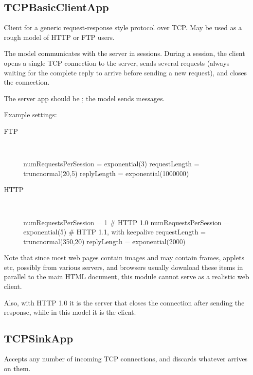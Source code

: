 \subsection{TCPBasicClientApp}

Client for a generic request-response style protocol over TCP.
May be used as a rough model of HTTP or FTP users.

The model communicates with the server in sessions. During a session,
the client opens a single TCP connection to the server, sends several
requests (always waiting for the complete reply to arrive before
sending a new request), and closes the connection.

The server app should be ; the model sends
 messages.

Example settings:

\begin{description}
\item[FTP] \quad \\

\begin{inifile}
numRequestsPerSession = exponential(3)
requestLength = truncnormal(20,5)
replyLength = exponential(1000000)
\end{inifile}

\item[HTTP] \quad \\

\begin{inifile}
numRequestsPerSession = 1 # HTTP 1.0
numRequestsPerSession = exponential(5)  # HTTP 1.1, with keepalive
requestLength = truncnormal(350,20)
replyLength = exponential(2000)
\end{inifile}

\end{description}

Note that since most web pages contain images and may contain frames,
applets etc, possibly from various servers, and browsers usually download
these items in parallel to the main HTML document, this module cannot
serve as a realistic web client.

Also, with HTTP 1.0 it is the server that closes the connection after
sending the response, while in this model it is the client.

\subsection{TCPSinkApp}

Accepts any number of incoming TCP connections, and discards whatever
arrives on them.

